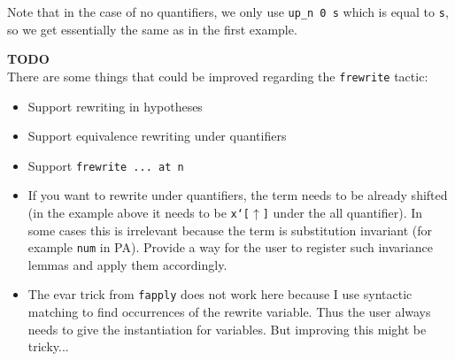 \documentclass[12pt, a4paper]{article}
\newcommand{\improve}[1]{
	\vspace{3pt}
	\begin{boximprove}
		\parbox{\textwidth}{\textcolor{colorimprove}{\textbf{TODO}\\#1}}
	\end{boximprove}}
\begin{document}
\bigskip\noindent
Note that in the case of no quantifiers, we only use \texttt{up\_n 0 s} which is equal to \texttt{s}, so we get essentially the same as in the first example.

\improve{There are some things that could be improved regarding the \texttt{frewrite} tactic:
\begin{itemize}
	\item Support rewriting in hypotheses
	\item Support equivalence rewriting under quantifiers
	\item Support \texttt{frewrite ... at n}
	\item If you want to rewrite under quantifiers, the term needs to be already shifted (in the example above it needs to be \texttt{x`[$\uparrow$]} under the all quantifier). In some cases this is irrelevant because the term is substitution invariant (for example \texttt{num} in PA). Provide a way for the user to register such invariance lemmas and apply them accordingly.
	\item The evar trick from \texttt{fapply} does not work here because I use syntactic matching to find occurrences of the rewrite variable. Thus the user always needs to give the instantiation for variables. But improving this might be tricky...
\end{itemize}}
\end{document}

